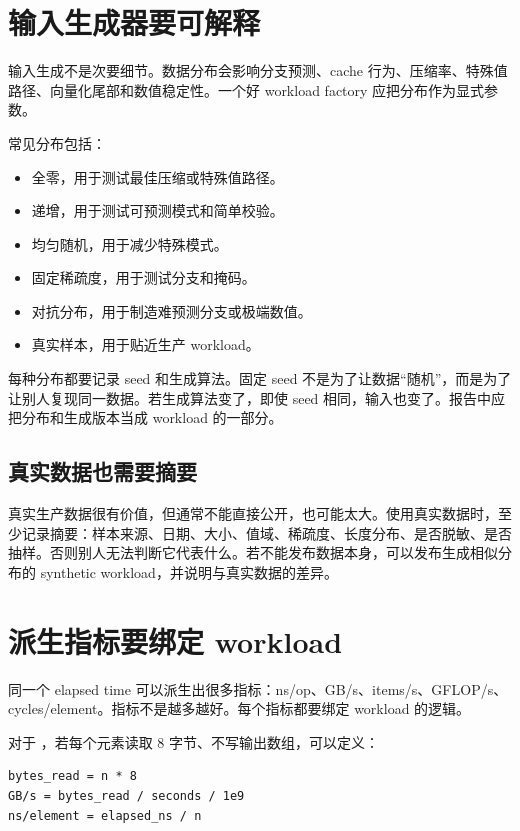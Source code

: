 \section{输入生成器要可解释}

输入生成不是次要细节。数据分布会影响分支预测、cache 行为、压缩率、特殊值路径、向量化尾部和数值稳定性。一个好 workload factory 应把分布作为显式参数。

常见分布包括：

\begin{itemize}
  \item 全零，用于测试最佳压缩或特殊值路径。
  \item 递增，用于测试可预测模式和简单校验。
  \item 均匀随机，用于减少特殊模式。
  \item 固定稀疏度，用于测试分支和掩码。
  \item 对抗分布，用于制造难预测分支或极端数值。
  \item 真实样本，用于贴近生产 workload。
\end{itemize}

每种分布都要记录 seed 和生成算法。固定 seed 不是为了让数据“随机”，而是为了让别人复现同一数据。若生成算法变了，即使 seed 相同，输入也变了。报告中应把分布和生成版本当成 workload 的一部分。

\subsection{真实数据也需要摘要}

真实生产数据很有价值，但通常不能直接公开，也可能太大。使用真实数据时，至少记录摘要：样本来源、日期、大小、值域、稀疏度、长度分布、是否脱敏、是否抽样。否则别人无法判断它代表什么。若不能发布数据本身，可以发布生成相似分布的 synthetic workload，并说明与真实数据的差异。

\section{派生指标要绑定 workload}

同一个 elapsed time 可以派生出很多指标：ns/op、GB/s、items/s、GFLOP/s、cycles/element。指标不是越多越好。每个指标都要绑定 workload 的逻辑。

对于 ，若每个元素读取 8 字节、不写输出数组，可以定义：

\begin{lstlisting}
bytes_read = n * 8
GB/s = bytes_read / seconds / 1e9
ns/element = elapsed_ns / n
\end{lstlisting}

